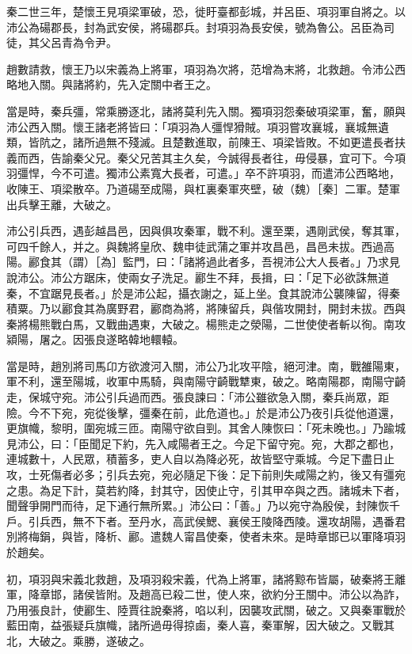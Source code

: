 \begin{pinyinscope}
秦二世三年，楚懷王見項梁軍破，恐，徙盱臺都彭城，并呂臣、項羽軍自將之。以沛公為碭郡長，封為武安侯，將碭郡兵。封項羽為長安侯，號為魯公。呂臣為司徒，其父呂青為令尹。

趙數請救，懷王乃以宋義為上將軍，項羽為次將，范增為末將，北救趙。令沛公西略地入關。與諸將約，先入定關中者王之。

當是時，秦兵彊，常乘勝逐北，諸將莫利先入關。獨項羽怨秦破項梁軍，奮，願與沛公西入關。懷王諸老將皆曰：「項羽為人彊悍猾賊。項羽嘗攻襄城，襄城無遺類，皆阬之，諸所過無不殘滅。且楚數進取，前陳王、項梁皆敗。不如更遣長者扶義而西，告諭秦父兄。秦父兄苦其主久矣，今誠得長者往，毋侵暴，宜可下。今項羽彊悍，今不可遣。獨沛公素寬大長者，可遣。」卒不許項羽，而遣沛公西略地，收陳王、項梁散卒。乃道碭至成陽，與杠裏秦軍夾壁，破（魏）［秦］二軍。楚軍出兵擊王離，大破之。

沛公引兵西，遇彭越昌邑，因與俱攻秦軍，戰不利。還至栗，遇剛武侯，奪其軍，可四千餘人，并之。與魏將皇欣、魏申徒武蒲之軍并攻昌邑，昌邑未拔。西過高陽。酈食其（謂）［為］監門，曰：「諸將過此者多，吾視沛公大人長者。」乃求見說沛公。沛公方踞床，使兩女子洗足。酈生不拜，長揖，曰：「足下必欲誅無道秦，不宜踞見長者。」於是沛公起，攝衣謝之，延上坐。食其說沛公襲陳留，得秦積粟。乃以酈食其為廣野君，酈商為將，將陳留兵，與偕攻開封，開封未拔。西與秦將楊熊戰白馬，又戰曲遇東，大破之。楊熊走之滎陽，二世使使者斬以徇。南攻潁陽，屠之。因張良遂略韓地轘轅。

當是時，趙別將司馬卬方欲渡河入關，沛公乃北攻平陰，絕河津。南，戰雒陽東，軍不利，還至陽城，收軍中馬騎，與南陽守齮戰犨東，破之。略南陽郡，南陽守齮走，保城守宛。沛公引兵過而西。張良諫曰：「沛公雖欲急入關，秦兵尚眾，距險。今不下宛，宛從後擊，彊秦在前，此危道也。」於是沛公乃夜引兵從他道還，更旗幟，黎明，圍宛城三匝。南陽守欲自剄。其舍人陳恢曰：「死未晚也。」乃踰城見沛公，曰：「臣聞足下約，先入咸陽者王之。今足下留守宛。宛，大郡之都也，連城數十，人民眾，積蓄多，吏人自以為降必死，故皆堅守乘城。今足下盡日止攻，士死傷者必多；引兵去宛，宛必隨足下後：足下前則失咸陽之約，後又有彊宛之患。為足下計，莫若約降，封其守，因使止守，引其甲卒與之西。諸城未下者，聞聲爭開門而待，足下通行無所累。」沛公曰：「善。」乃以宛守為殷侯，封陳恢千戶。引兵西，無不下者。至丹水，高武侯鰓、襄侯王陵降西陵。還攻胡陽，遇番君別將梅鋗，與皆，降析、酈。遣魏人甯昌使秦，使者未來。是時章邯已以軍降項羽於趙矣。

初，項羽與宋義北救趙，及項羽殺宋義，代為上將軍，諸將黥布皆屬，破秦將王離軍，降章邯，諸侯皆附。及趙高已殺二世，使人來，欲約分王關中。沛公以為詐，乃用張良計，使酈生、陸賈往說秦將，啗以利，因襲攻武關，破之。又與秦軍戰於藍田南，益張疑兵旗幟，諸所過毋得掠鹵，秦人喜，秦軍解，因大破之。又戰其北，大破之。乘勝，遂破之。


\end{pinyinscope}
